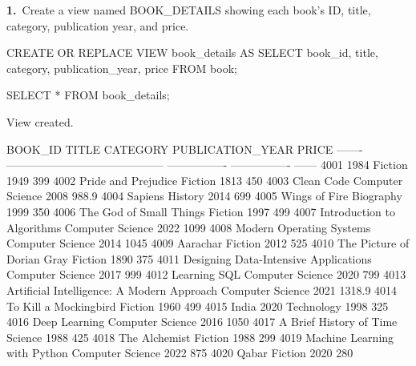 \noindent\begin{minipage}{\linewidth}
\begingroup{}
{\fontsize{14}{17}\selectfont\textbf{1.}}\ Create a view named BOOK\_DETAILS showing each book's ID, title, category, publication year, and price.\par
\endgroup\vspace{12pt}


\begin{sqlcode}
CREATE OR REPLACE VIEW book_details AS
SELECT book_id, title, category, publication_year, price
FROM book;

SELECT * FROM book_details;
\end{sqlcode}

\vspace{18pt}


\begin{sqlout}[fontsize=\scriptsize]
View created.

BOOK_ID  TITLE                                       CATEGORY          PUBLICATION_YEAR   PRICE
-------  ------------------------------------------  ----------------  ----------------  ------
   4001  1984                                        Fiction                       1949     399
   4002  Pride and Prejudice                         Fiction                       1813     450
   4003  Clean Code                                  Computer Science              2008   988.9
   4004  Sapiens                                     History                       2014     699
   4005  Wings of Fire                               Biography                     1999     350
   4006  The God of Small Things                     Fiction                       1997     499
   4007  Introduction to Algorithms                  Computer Science              2022    1099
   4008  Modern Operating Systems                    Computer Science              2014    1045
   4009  Aarachar                                    Fiction                       2012     525
   4010  The Picture of Dorian Gray                  Fiction                       1890     375
   4011  Designing Data-Intensive Applications       Computer Science              2017     999
   4012  Learning SQL                                Computer Science              2020     799
   4013  Artificial Intelligence: A Modern Approach  Computer Science              2021  1318.9
   4014  To Kill a Mockingbird                       Fiction                       1960     499
   4015  India 2020                                  Technology                    1998     325
   4016  Deep Learning                               Computer Science              2016    1050
   4017  A Brief History of Time                     Science                       1988     425
   4018  The Alchemist                               Fiction                       1988     299
   4019  Machine Learning with Python                Computer Science              2022     875
   4020  Qabar                                       Fiction                       2020     280


\end{sqlout}
\end{minipage}

